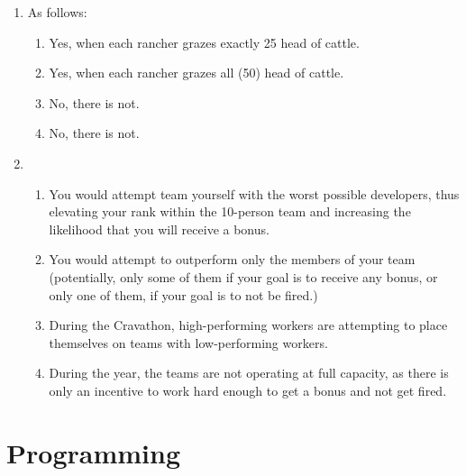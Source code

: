 \documentclass{article}
\begin{document}
\begin{enumerate}
\begin{enumerate}
\end{enumerate}

\item{} %

As follows:

\begin{enumerate}

\item{} Yes, when each rancher grazes exactly 25 head of cattle.

\item{} Yes, when each rancher grazes all (50) head of cattle.

\item{} No, there is not.

\item{} No, there is not.

\end{enumerate}

\item{} %

\begin{enumerate}

\item{} You would attempt team yourself with the worst possible developers, thus elevating your rank within the 10-person team and increasing the likelihood that you will receive a bonus.

\item{} You would attempt to outperform only the members of your team (potentially, only some of them if your goal is to receive any bonus, or only one of them, if your goal is to not be fired.)%

\item{} During the Cravathon, high-performing workers are attempting to place themselves on teams with low-performing workers. %

\item{} During the year, the teams are not operating at full capacity, as there is only an incentive to work hard enough to get a bonus and not get fired.%

\end{enumerate}

\end{enumerate}

\newpage

\section*{Programming}
\end{document}
